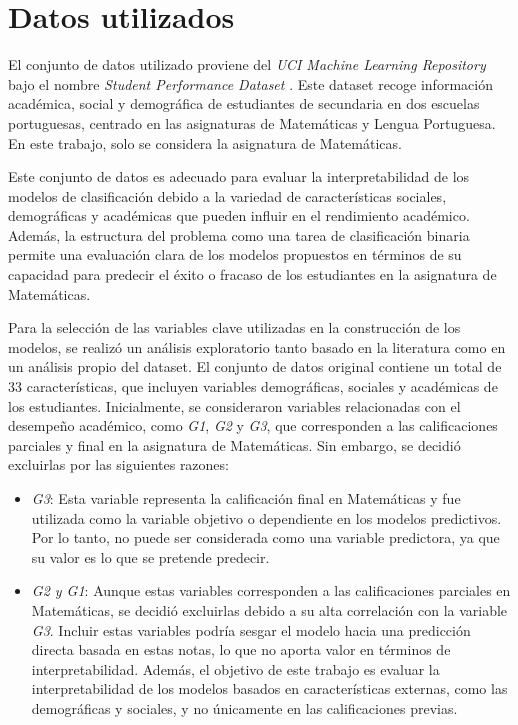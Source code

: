 \section{Datos utilizados}

El conjunto de datos utilizado proviene del \textit{UCI Machine Learning Repository} bajo el nombre \textit{Student Performance Dataset} \cite{cortez2014student}. Este dataset recoge información académica, social y demográfica de estudiantes de secundaria en dos escuelas portuguesas, centrado en las asignaturas de Matemáticas y Lengua Portuguesa. En este trabajo, solo se considera la asignatura de Matemáticas.

Este conjunto de datos es adecuado para evaluar la interpretabilidad de los modelos de clasificación debido a la variedad de características sociales, demográficas y académicas que pueden influir en el rendimiento académico. Además, la estructura del problema como una tarea de clasificación binaria permite una evaluación clara de los modelos propuestos en términos de su capacidad para predecir el éxito o fracaso de los estudiantes en la asignatura de Matemáticas.

Para la selección de las variables clave utilizadas en la construcción de los modelos, se realizó un análisis exploratorio tanto basado en la literatura \cite{cortez-2014} como en un análisis propio del dataset. El conjunto de datos original contiene un total de 33 características, que incluyen variables demográficas, sociales y académicas de los estudiantes. Inicialmente, se consideraron variables relacionadas con el desempeño académico, como \textit{G1}, \textit{G2} y \textit{G3}, que corresponden a las calificaciones parciales y final en la asignatura de Matemáticas. Sin embargo, se decidió excluirlas por las siguientes razones:

\begin{itemize}
    \item \textit{G3}: Esta variable representa la calificación final en Matemáticas y fue utilizada como la variable objetivo o dependiente en los modelos predictivos. Por lo tanto, no puede ser considerada como una variable predictora, ya que su valor es lo que se pretende predecir.
    
    \item \textit{G2 y G1}: Aunque estas variables corresponden a las calificaciones parciales en Matemáticas, se decidió excluirlas debido a su alta correlación con la variable \textit{G3}. Incluir estas variables podría sesgar el modelo hacia una predicción directa basada en estas notas, lo que no aporta valor en términos de interpretabilidad. Además, el objetivo de este trabajo es evaluar la interpretabilidad de los modelos basados en características externas, como las demográficas y sociales, y no únicamente en las calificaciones previas.
\end{itemize}

